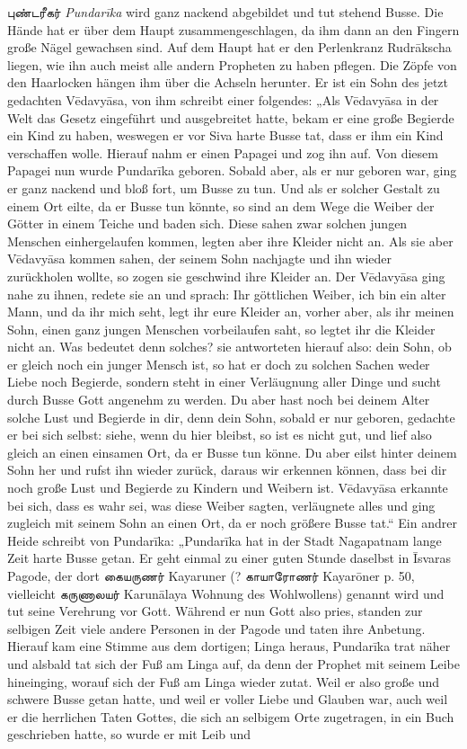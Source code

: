 \documentclass{article}
\newcommand{\TamilText}[1]{\texttamil{#1}}
\newcommand{\tam}[1]{\TamilText{#1}}
\begin{document}
\tam{புண்டரீகர்} \emph{Pundar\={i}ka} wird ganz nackend abgebildet und tut stehend Busse. Die Hände hat er über dem Haupt zusammengeschlagen, da ihm dann an den Fingern große Nägel gewachsen sind. Auf dem Haupt hat er den Perlenkranz Rudr\={a}kscha liegen, wie ihn auch meist alle andern Propheten zu haben pflegen. Die Zöpfe von den Haarlocken hängen ihm über die Achseln herunter. Er ist ein Sohn des jetzt gedachten V\={e}davy\={a}sa, von ihm schreibt einer folgendes: „Als V\={e}davy\={a}sa in der Welt das Gesetz eingeführt und ausgebreitet hatte, bekam er eine große Begierde ein Kind zu haben, weswegen er vor Siva harte Busse tat, dass er ihm ein Kind verschaffen wolle. Hierauf nahm er einen Papagei und zog ihn auf. Von diesem Papagei nun wurde Pundar\={i}ka geboren. Sobald aber, als er nur geboren war, ging er ganz nackend und bloß fort, um Busse zu tun. Und als er solcher Gestalt zu einem Ort eilte, da er Busse tun könnte, so sind an dem Wege die Weiber der Götter in einem Teiche und baden sich. Diese sahen zwar solchen jungen Menschen einhergelaufen kommen, legten aber ihre Kleider nicht an. Als sie aber V\={e}davy\={a}sa kommen sahen, der seinem Sohn nachjagte und ihn wieder zurückholen wollte, so zogen sie geschwind ihre Kleider an. Der V\={e}davy\={a}sa ging nahe zu ihnen, redete sie an und sprach: Ihr göttlichen Weiber, ich bin ein alter Mann, und da ihr mich seht, legt ihr eure Kleider an, vorher aber, als ihr meinen Sohn, einen ganz jungen Menschen vorbeilaufen saht, so legtet ihr die Kleider nicht an. Was bedeutet denn solches? sie antworteten hierauf also: dein Sohn, ob er gleich noch ein junger Mensch ist, so hat er doch zu solchen Sachen weder Liebe noch Begierde, sondern steht in einer Verläugnung aller Dinge und sucht durch Busse Gott angenehm zu werden. Du aber hast noch bei deinem Alter solche Lust und Begierde in dir, denn dein Sohn, sobald er nur geboren, gedachte er bei sich selbst: siehe, wenn du hier bleibst, so ist es nicht gut, und lief also gleich an einen einsamen Ort, da er Busse tun könne. Du aber eilst hinter deinem Sohn her und rufst ihn wieder zurück, daraus wir erkennen können, dass bei dir noch große Lust und Begierde zu Kindern und Weibern ist. V\={e}davy\={a}sa erkannte bei sich, dass es wahr sei, was diese Weiber sagten, verläugnete alles und ging zugleich mit seinem Sohn an einen Ort, da er noch größere Busse tat.“ Ein andrer Heide schreibt von Pundar\={i}ka: „Pundar\={i}ka hat in der Stadt Nagapatnam lange Zeit harte Busse getan. Er geht einmal zu einer guten Stunde daselbst in \={I}svaras Pagode, der dort \tam{கையருணர்} Kayaruner (? \tam{காயாரோணர்} Kayar\={o}ner p. 50, vielleicht \tam{கருணாலயர்} Karun\={a}laya Wohnung des Wohlwollens) genannt wird und tut seine Verehrung vor Gott. Während er nun Gott also pries, standen zur selbigen Zeit viele andere Personen in der Pagode und taten ihre Anbetung. Hierauf kam eine Stimme aus dem dortigen; Linga heraus, Pundar\={i}ka trat näher und alsbald tat sich der Fuß am Linga auf, da denn der Prophet mit seinem Leibe hineinging, worauf sich der Fuß am Linga wieder zutat. Weil er also große und schwere Busse getan hatte, und weil er voller Liebe und Glauben war, auch weil er die herrlichen Taten Gottes, die sich an selbigem Orte zugetragen, in ein Buch geschrieben hatte, so wurde er mit Leib und 
\end{document}
